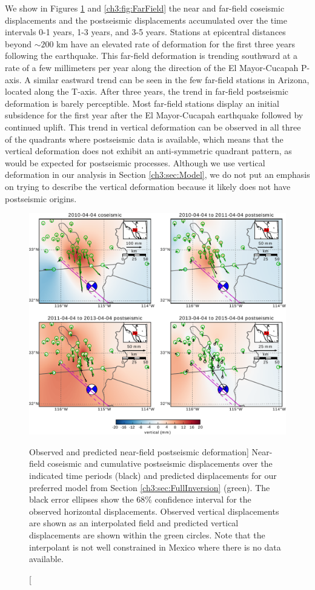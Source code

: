 We show in Figures \ref{ch3:fig:NearField} and \ref{ch3:fig:FarField}
the near and far-field coseismic displacements and the postseismic
displacements accumulated over the time intervals 0-1 years, 1-3
years, and 3-5 years.  Stations at epicentral distances beyond
${\sim}200$ km have an elevated rate of deformation for the first
three years following the earthquake.  This far-field deformation is
trending southward at a rate of a few millimeters per year along the
direction of the El Mayor-Cucapah P-axis.  A similar eastward trend
can be seen in the few far-field stations in Arizona, located along
the T-axis.  After three years, the trend in far-field postseismic
deformation is barely perceptible.  Most far-field stations display an
initial subsidence for the first year after the El Mayor-Cucapah
earthquake followed by continued uplift.  This trend in vertical
deformation can be observed in all three of the quadrants where
postseismic data is available, which means that the vertical
deformation does not exhibit an anti-symmetric quadrant pattern, as
would be expected for postseismic processes.  Although we use vertical
deformation in our analysis in Section \ref{ch3:sec:Model}, we do not
put an emphasis on trying to describe the vertical deformation because
it likely does not have postseismic origins.

\begin{figure}
\includegraphics[scale=0.9]{ch3/figures/2016jb013114-p04}
\caption
[Observed and predicted near-field postseismic deformation]
{Near-field coseismic and cumulative postseismic displacements
over the indicated time periods (black) and predicted displacements
for our preferred model from Section \ref{ch3:sec:FullInversion}
(green).  The black error ellipses show the 68\% confidence interval
for the observed horizontal displacements.  Observed vertical
displacements are shown as an interpolated field and predicted
vertical displacements are shown within the green circles.  Note that
the interpolant is not well constrained in Mexico where there is no
data available.}
\label{ch3:fig:NearField}
\end{figure}

